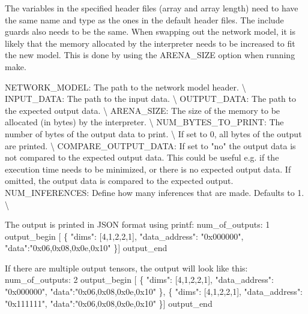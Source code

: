 The variables in the specified header files (array and array length) need to have the same name and type as the ones in the default header files. The include guards also needs to be the same. When swapping out the network model, it is likely that the memory allocated by the interpreter needs to be increased to fit the new model. This is done by using the {\ttfamily ARENA\+\_\+\+SIZE} option when running {\ttfamily make}.


\begin{DoxyCode}{0}

\end{DoxyCode}


{\ttfamily NETWORK\+\_\+\+MODEL}\+: The path to the network model header. \textbackslash{} {\ttfamily INPUT\+\_\+\+DATA}\+: The path to the input data. \textbackslash{} {\ttfamily OUTPUT\+\_\+\+DATA}\+: The path to the expected output data. \textbackslash{} {\ttfamily ARENA\+\_\+\+SIZE}\+: The size of the memory to be allocated (in bytes) by the interpreter. \textbackslash{} {\ttfamily NUM\+\_\+\+BYTES\+\_\+\+TO\+\_\+\+PRINT}\+: The number of bytes of the output data to print. \textbackslash{} If set to 0, all bytes of the output are printed. \textbackslash{} {\ttfamily COMPARE\+\_\+\+OUTPUT\+\_\+\+DATA}\+: If set to "{}no"{} the output data is not compared to the expected output data. This could be useful e.\+g. if the execution time needs to be minimized, or there is no expected output data. If omitted, the output data is compared to the expected output. {\ttfamily NUM\+\_\+\+INFERENCES}\+: Define how many inferences that are made. Defaults to 1. \textbackslash{}

The output is printed in JSON format using printf\+: {\ttfamily num\+\_\+of\+\_\+outputs\+: 1 output\+\_\+begin \mbox{[} \{ "{}dims"{}\+: \mbox{[}4,1,2,2,1\mbox{]}, "{}data\+\_\+address"{}\+: "{}0x000000"{}, "{}data"{}\+:"{}0x06,0x08,0x0e,0x10"{} \}\mbox{]} output\+\_\+end}

If there are multiple output tensors, the output will look like this\+: {\ttfamily num\+\_\+of\+\_\+outputs\+: 2 output\+\_\+begin \mbox{[} \{ "{}dims"{}\+: \mbox{[}4,1,2,2,1\mbox{]}, "{}data\+\_\+address"{}\+: "{}0x000000"{}, "{}data"{}\+:"{}0x06,0x08,0x0e,0x10"{} \}, \{ "{}dims"{}\+: \mbox{[}4,1,2,2,1\mbox{]}, "{}data\+\_\+address"{}\+: "{}0x111111"{}, "{}data"{}\+:"{}0x06,0x08,0x0e,0x10"{} \}\mbox{]} output\+\_\+end} 